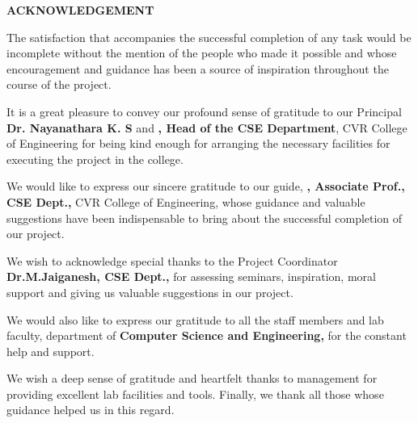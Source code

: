 \documentclass[../Report.tex]{subfiles}
\begin{document}
\begin{center}
    \textbf{ACKNOWLEDGEMENT}
\end{center}
The satisfaction that accompanies the successful completion of any task would be incomplete without the mention of the people who made it 
possible and whose encouragement and guidance has been a source of inspiration throughout the course of the project.\par

It is a great pleasure to convey our profound sense of gratitude to our Principal \textbf{Dr. Nayanathara K. S} and 
\textbf{\hodName, Head of the CSE Department}, CVR College of Engineering for being kind enough for arranging the necessary facilities 
for executing the project in the college.\par

We would like to express our sincere gratitude to our guide, \textbf{\guideName, Associate Prof., CSE Dept.,} CVR College of Engineering,
whose guidance and valuable suggestions have been indispensable to bring
about the successful completion of our project.\par

We wish to acknowledge special thanks to the Project Coordinator \textbf{Dr.M.Jaiganesh, CSE Dept.,} for assessing seminars, 
inspiration, moral support and giving us valuable suggestions in our project.\par

We would also like to express our gratitude to all the staff members and lab faculty, department of 
\textbf{Computer Science and Engineering,} \textbf{\collegeName} for the constant help and support.\par

We wish a deep sense of gratitude and heartfelt thanks to management for providing excellent lab facilities and tools. Finally, 
we thank all those whose guidance helped us in this regard. \par

\pagebreak
\end{document}
